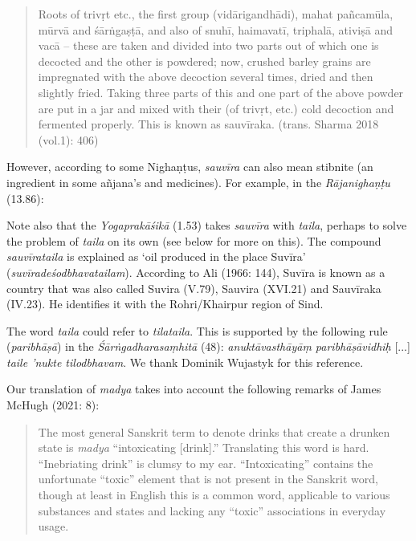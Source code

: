 \begin{ekdosis}
\begin{philcomm}[hp01_059]
\begin{quote}
Roots of trivṛt etc., the first group (vidārigandhādi), mahat pañcamūla, mūrvā and śārṅgaṣṭā, and also of snuhī, haimavatī, triphalā, ativiṣā and vacā -- these are taken and divided into two parts out of which one is decocted and the other is powdered; now, crushed barley grains are impregnated with the above decoction several times, dried and then slightly fried. Taking three parts of this and one part of the above powder are put in a jar and mixed with their (of trivṛt, etc.) cold decoction and fermented properly. This is known as sauvīraka. (trans. Sharma 2018 (vol.1): 406)
\end{quote}

However, according to some Nighaṇṭus, \emph{sauvīra} can also mean stibnite (an ingredient in some añjana’s and medicines). For example, in the \emph{Rājanighaṇṭu} (13.86):


\begin{versinnote}
\end{versinnote}

Note also that the \emph{Yogaprakāśikā} (1.53) takes \emph{sauvīra} with \emph{taila}, perhaps to solve the problem of \emph{taila} on its own (see below for more on this). The compound \emph{sauvīrataila} is explained as `oil produced in the place Suvīra' (\emph{suvīradeśodbhavatailam}). According to Ali (1966: 144), Suvīra is known as a country that was also called Suvira (V.79), Sauvira (XVI.21) and Sauvīraka (IV.23). He identifies it with the Rohri/Khairpur region of Sind. 

The word \emph{taila} could refer to \emph{tilataila}. This is supported by the following rule (\emph{paribhāṣā}) in the \emph{Śārṅgadharasaṃhitā} (48):
\emph{anuktāvasthāyāṃ paribhāṣāvidhiḥ} [...] \emph{taile ’nukte tilodbhavam}. We thank Dominik Wujastyk for this reference.  

Our translation of \emph{madya} takes into account the following remarks of James McHugh (2021: 8):
\begin{quote}
    The most general Sanskrit term to denote drinks that create a drunken state is \emph{madya} “intoxicating [drink].” Translating this word is hard. “Inebriating drink” is clumsy to my ear. “Intoxicating” contains the unfortunate “toxic” element that is not present in the Sanskrit word, though at least in English this is a common word, applicable to various substances and states and lacking any “toxic” associations in everyday usage.
\end{quote}


\end{philcomm}
\end{ekdosis}
